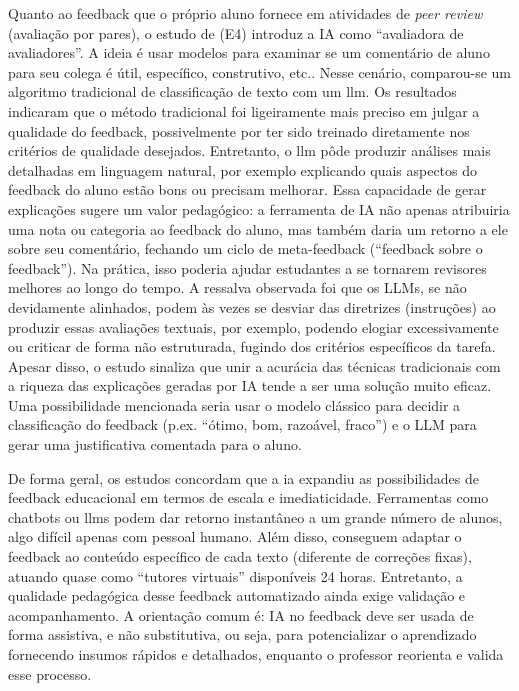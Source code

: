Quanto ao feedback que o próprio aluno fornece em atividades de \textit{peer review} (avaliação por pares), o estudo de  (E4) introduz a IA como “avaliadora de avaliadores”. A ideia é usar modelos para examinar se um comentário de aluno para seu colega é útil, específico, construtivo, etc.. Nesse cenário, comparou-se um algoritmo tradicional de classificação de texto com um \gls{llm}. Os resultados indicaram que o método tradicional foi ligeiramente mais preciso em julgar a qualidade do feedback, possivelmente por ter sido treinado diretamente nos critérios de qualidade desejados. Entretanto, o \gls{llm} pôde produzir análises mais detalhadas em linguagem natural, por exemplo explicando quais aspectos do feedback do aluno estão bons ou precisam melhorar. Essa capacidade de gerar explicações sugere um valor pedagógico: a ferramenta de IA não apenas atribuiria uma nota ou categoria ao feedback do aluno, mas também daria um retorno a ele sobre seu comentário, fechando um ciclo de meta-feedback (“feedback sobre o feedback”). Na prática, isso poderia ajudar estudantes a se tornarem revisores melhores ao longo do tempo. A ressalva observada foi que os LLMs, se não devidamente alinhados, podem às vezes se desviar das diretrizes (instruções) ao produzir essas avaliações textuais, por exemplo, podendo elogiar excessivamente ou criticar de forma não estruturada, fugindo dos critérios específicos da tarefa. Apesar disso, o estudo sinaliza que unir a acurácia das técnicas tradicionais com a riqueza das explicações geradas por IA tende a ser uma solução muito eficaz. Uma possibilidade mencionada seria usar o modelo clássico para decidir a classificação do feedback (p.ex. “ótimo, bom, razoável, fraco”) e o LLM para gerar uma justificativa comentada para o aluno. 

De forma geral, os estudos concordam que a \gls{ia} expandiu as possibilidades de feedback educacional em termos de escala e imediaticidade. Ferramentas como chatbots ou \gls{llm}s podem dar retorno instantâneo a um grande número de alunos, algo difícil apenas com pessoal humano. Além disso, conseguem adaptar o feedback ao conteúdo específico de cada texto (diferente de correções fixas), atuando quase como “tutores virtuais” disponíveis 24 horas. Entretanto, a qualidade pedagógica desse feedback automatizado ainda exige validação e acompanhamento. A orientação comum é: IA no feedback deve ser usada de forma assistiva, e não substitutiva, ou seja, para potencializar o aprendizado fornecendo insumos rápidos e detalhados, enquanto o professor reorienta e valida esse processo.

